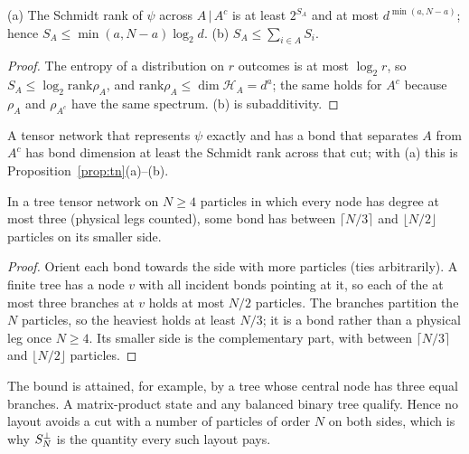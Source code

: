 \begin{lem}\label{lem:cap}
(a) The Schmidt rank of $\psi$ across $A\,|\,A^c$ is at least $2^{S_A}$ and at most $d^{\min(a,N-a)}$; hence $S_A\le\min(a,N-a)\log_2d$. (b) $S_A\le\sum_{i\in A}S_i$.
\end{lem}
\begin{proof}
The entropy of a distribution on $r$ outcomes is at most $\log_2r$, so $S_A\le\log_2\mathrm{rank}\rho_A$, and $\mathrm{rank}\rho_A\le\dim\mathcal H_A=d^a$; the same holds for $A^c$ because $\rho_A$ and $\rho_{A^c}$ have the same spectrum. (b) is subadditivity.
\end{proof}
A tensor network that represents $\psi$ exactly and has a bond that separates $A$ from $A^c$ has bond dimension at least the Schmidt rank across that cut; with (a) this is Proposition~\ref{prop:tn}(a)--(b).

\begin{lem}[Pivot]\label{lem:pivot}
In a tree tensor network on $N\ge4$ particles in which every node has degree at most three (physical legs counted), some bond has between $\lceil N/3\rceil$ and $\lfloor N/2\rfloor$ particles on its smaller side.
\end{lem}
\begin{proof}
Orient each bond towards the side with more particles (ties arbitrarily). A finite tree has a node $v$ with all incident bonds pointing at it, so each of the at most three branches at $v$ holds at most $N/2$ particles. The branches partition the $N$ particles, so the heaviest holds at least $N/3$;
it is a bond rather than a physical leg once $N\ge4$. Its smaller side is the complementary part, with between $\lceil N/3\rceil$ and $\lfloor N/2\rfloor$ particles.
\end{proof}
The bound is attained, for example, by a tree whose central node has three equal branches. A matrix-product state and any balanced binary tree qualify. Hence no layout avoids a cut with a number of particles of order $N$ on both sides, which is why $S^{\perp}_N$ is the quantity every such layout pays.

